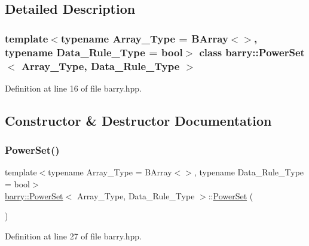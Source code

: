 \subsection{Detailed Description}
\subsubsection*{template$<$typename Array\+\_\+\+Type = B\+Array$<$$>$, typename Data\+\_\+\+Rule\+\_\+\+Type = bool$>$\newline
class barry\+::\+Power\+Set$<$ Array\+\_\+\+Type, Data\+\_\+\+Rule\+\_\+\+Type $>$}



Definition at line 16 of file barry.\+hpp.



\subsection{Constructor \& Destructor Documentation}
\mbox{\label{classbarry_1_1_power_set_ab2fa4e40323bb9225225bb52b86ff345}} 
\subsubsection{\texorpdfstring{Power\+Set()}{PowerSet()}\hspace{0.1cm}{\footnotesize\ttfamily [1/2]}}
{\footnotesize\ttfamily template$<$typename Array\+\_\+\+Type  = B\+Array$<$$>$, typename Data\+\_\+\+Rule\+\_\+\+Type  = bool$>$ \\
\hyperlink{classbarry_1_1_power_set}{barry\+::\+Power\+Set}$<$ Array\+\_\+\+Type, Data\+\_\+\+Rule\+\_\+\+Type $>$\+::\hyperlink{classbarry_1_1_power_set}{Power\+Set} (\begin{DoxyParamCaption}{ }\end{DoxyParamCaption})\hspace{0.3cm}{\ttfamily [inline]}}



Definition at line 27 of file barry.\+hpp.

\mbox{\label{classbarry_1_1_power_set_a96a31964644ea81991fe103a2a8bfb1f}} 
